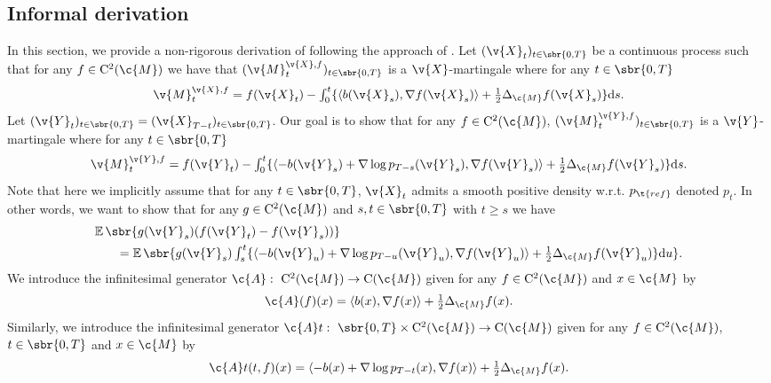 \subsection{Informal derivation}
\label{sec:informal-derivation}

In this section, we provide a non-rigorous derivation of  following the approach of \textcite{haussmann1986time}.
Let $(\v{X}_t)_{t \in \sbr{0,T}}$ be a continuous process such that for any $f \in \mathrm{C}^2(\c{M})$ we have that $(\v{M}_t^{\v{X}, f})_{t \in \sbr{0,T}}$ is a $\v{X}$-martingale where for any $t \in \sbr{0,T}$ \begin{equation} \label{eq:martingale_forward} \textstyle{ \v{M}_t^{\v{X}, f} = f(\v{X}_t) - \int_0^t \{ \langle b(\v{X}_s), \nabla f(\v{X}_s) \rangle + \tfrac{1}{2} \Delta_\c{M} f(\v{X}_s) \} \mathrm{d} s .
	}
\end{equation}
Let $(\v{Y}_t)_{t \in \sbr{0,T}} = (\v{X}_{T-t})_{t \in \sbr{0,T}}$.
Our goal is to show that for any $f \in \mathrm{C}^2(\c{M})$, $(\v{M}_t^{\v{Y}, f})_{t \in \sbr{0,T}}$ is a $\v{Y}$-martingale where for any $t \in \sbr{0,T}$ \begin{equation} \textstyle{ \v{M}_t^{\v{Y}, f} = f(\v{Y}_t) - \int_0^t \{ \langle - b(\v{Y}_s) + \nabla \log p_{T-s}(\v{Y}_s), \nabla f(\v{Y}_s) \rangle + \tfrac{1}{2} \Delta_\c{M} f(\v{Y}_s) \} \mathrm{d} s .
	}
\end{equation}
Note that here we implicitly assume that for any $t \in \sbr{0,T}$, $\v{X}_t$ admits a smooth positive density w.r.t.
$p_{\t{ref}}$ denoted $p_t$.
In other words, we want to show that for any $g \in \mathrm{C}^2(\c{M})$ and $s, t \in \sbr{0,T}$ with $t \geq s$ we have \begin{align} \label{eq:time_reversal_manifold_haussman} & \textstyle{\E\sbr{g(\v{Y}_s)(f(\v{Y}_t) - f(\v{Y}_s))}} \\  & \qquad \textstyle{= \E\sbr{g(\v{Y}_s)\int_s^t \{ \langle - b(\v{Y}_u) + \nabla \log p_{T-u}(\v{Y}_u), \nabla f(\v{Y}_u) \rangle + \tfrac{1}{2} \Delta_\c{M} f(\v{Y}_u) \} \mathrm{d} u} .
                 }
\end{align}
We introduce the infinitesimal generator $\c{A}: \ \mathrm{C}^2(\c{M}) \to \mathrm{C}(\c{M})$ given for any $f \in \mathrm{C}^2(\c{M})$ and $x \in \c{M}$ by \begin{equation} \c{A} (f)(x) = \langle b(x) , \nabla f(x) \rangle + \tfrac{1}{2} \Delta_\c{M} f(x) .
\end{equation}
Similarly, we introduce the infinitesimal generator $\c{A}t: \ \sbr{0,T} \times \mathrm{C}^2(\c{M}) \to \mathrm{C}(\c{M})$ given for any $f \in \mathrm{C}^2(\c{M})$, $t \in \sbr{0,T}$ and $x \in \c{M}$ by \begin{equation} \c{A}t (t, f)(x) = \langle -b(x) + \nabla \log p_{T-t}(x), \nabla f(x) \rangle + \tfrac{1}{2} \Delta_\c{M} f(x) .
\end{equation}
